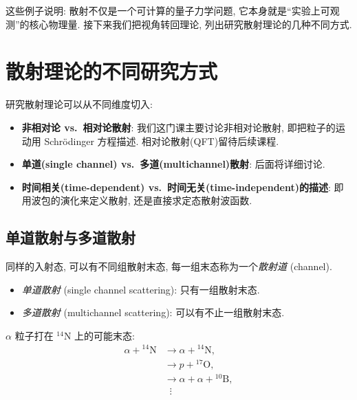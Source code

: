 这些例子说明: 散射不仅是一个可计算的量子力学问题, 它本身就是``实验上可观测''的核心物理量. 接下来我们把视角转回理论, 列出研究散射理论的几种不同方式.

\section{散射理论的不同研究方式}\label{sec:scattering-approaches}

研究散射理论可以从不同维度切入:
\begin{itemize}
    \item \textbf{非相对论 vs.\ 相对论散射}: 我们这门课主要讨论非相对论散射, 即把粒子的运动用 Schr\"odinger 方程描述. 相对论散射(QFT)留待后续课程.
    \item \textbf{单道(single channel) vs.\ 多道(multichannel)散射}: 后面将详细讨论.
    \item \textbf{时间相关(time-dependent) vs.\ 时间无关(time-independent)的描述}: 即用波包的演化来定义散射, 还是直接求定态散射波函数.
\end{itemize}

\subsection{单道散射与多道散射}\label{subsec:single-multi-channel}

\begin{definition}[散射道]
同样的入射态, 可以有不同组散射末态, 每一组末态称为一个\emph{散射道} (channel).
\end{definition}

\begin{itemize}
    \item \emph{单道散射} (single channel scattering): 只有一组散射末态.
    \item \emph{多道散射} (multichannel scattering): 可以有不止一组散射末态.
\end{itemize}

\begin{example}[多道散射]
$\alpha$ 粒子打在 ${}^{14}\mathrm{N}$ 上的可能末态:
\begin{align}
\alpha+{}^{14}\mathrm{N}&\to \alpha+{}^{14}\mathrm{N},\\
                       &\to p+{}^{17}\mathrm{O},\\
                       &\to \alpha+\alpha+{}^{10}\mathrm{B},\\
                       &\;\;\vdots
\end{align}
\end{example}

